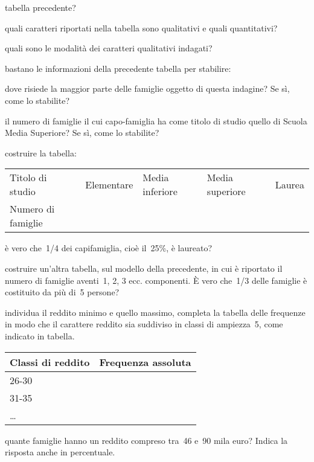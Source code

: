 \begin{esercizio}
\begin{itemize*}
tabella precedente?
\item quali caratteri riportati nella tabella sono qualitativi e quali 
quantitativi?
\item quali sono le modalità dei caratteri qualitativi indagati?
\item bastano le informazioni della precedente tabella per stabilire:
\begin{itemize*}
\item dove risiede la maggior parte delle famiglie oggetto di questa 
indagine? Se sì, come lo stabilite?
\item il numero di famiglie il cui capo-famiglia ha come titolo di studio 
quello di Scuola Media Superiore? Se sì, come lo stabilite?
\end{itemize*}
\item costruire la tabella:
\begin{center}
 \begin{tabular}{lllll}
\toprule
Titolo di studio & Elementare & Media inferiore & Media superiore & Laurea 
\\
Numero di famiglie & & & & \\
\bottomrule
\end{tabular}
\end{center}
\item è vero che~1/4 dei capifamiglia, cioè il~25\%, è laureato?
\item costruire un'altra tabella, sul modello della precedente, in cui è 
riportato il numero di famiglie aventi~1, 2, 3 ecc. componenti.
È vero che~1/3 delle famiglie è costituito da più di~5 persone?
\item individua il reddito minimo e quello massimo, completa la tabella 
delle frequenze in modo che il carattere reddito
sia suddiviso in classi di ampiezza~5, come indicato in tabella.
\begin{center}
\begin{tabular}{ll}
\toprule
Classi di reddito & Frequenza assoluta \\
\midrule
26-30 &  \\
31-35 &  \\
\ldots   &  \\
\bottomrule
\end{tabular}
\end{center}
\item quante famiglie hanno un reddito compreso tra~46 e~90 mila euro? 
Indica la risposta anche in percentuale.
\end{itemize*}
\end{esercizio}

